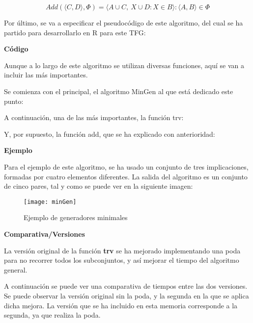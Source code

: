     \[
        Add(\langle C, {D} \rangle, \Phi) = {\langle A \cup C, ~ {X \cup D: X \in B} \rangle : \langle A, B\rangle \in \Phi}    
    \]


    Por \'ultimo, se va a especificar el pseudoc\'odigo de este algoritmo, del cual se ha partido para desarrollarlo en R para este TFG:
    \bigskip

    

    \bigskip

    \bigskip

    \textbf{C\'odigo}

    Aunque a lo largo de este algoritmo se utilizan diversas funciones, aqu\'i se van a incluir las m\'as importantes.
    
    Se comienza con el principal, el algoritmo MinGen al que est\'a dedicado este punto:

    

    A continuaci\'on, una de las m\'as importantes, la funci\'on trv:

    

    Y, por supuesto, la funci\'on add, que se ha explicado con anterioridad:

    

    \bigskip
    \textbf{Ejemplo}

    Para el ejemplo de este algoritmo, se ha usado un conjunto de tres implicaciones, formadas por cuatro elementos diferentes.
    La salida del algoritmo es un conjunto de cinco pares, tal y como se puede ver en la siguiente imagen:

    \begin{figure}[H]
        \centering
        \texttt{[image: minGen]}
        \caption{Ejemplo de generadores minimales}
        \label{fig:minGen}
    \end{figure}

    

    \bigskip
    \textbf{Comparativa/Versiones}

    La versi\'on original de la funci\'on \textbf{trv} se ha mejorado implementando una poda para no recorrer todos los subconjuntos, y as\'i 
    mejorar el tiempo del algoritmo general.

    A continuaci\'on se puede ver una comparativa de tiempos entre las dos versiones. Se puede observar la versi\'on original sin la poda, y 
    la segunda en la que se aplica dicha mejora. La versi\'on que se ha incluido en esta memoria corresponde a la segunda, ya que 
    realiza la poda.

